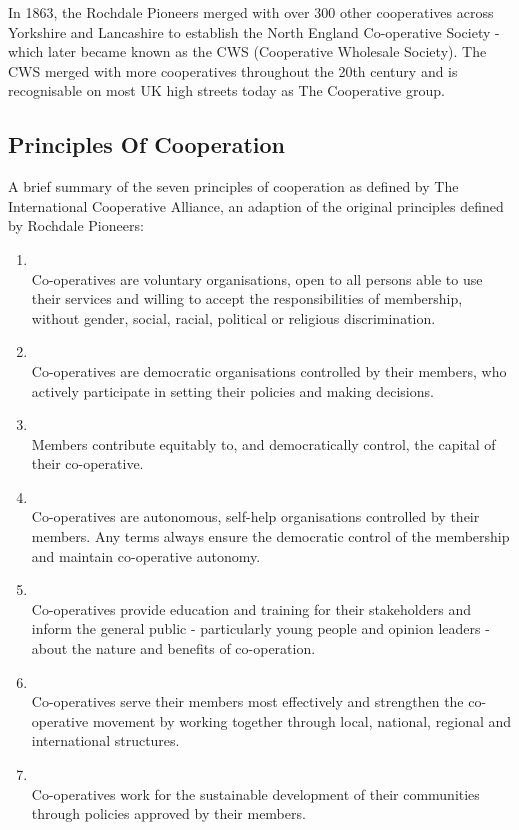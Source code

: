 In 1863, the Rochdale Pioneers merged with over 300 other cooperatives across Yorkshire and Lancashire to establish the North England Co-operative Society - which later became known as the CWS (Cooperative Wholesale Society). The CWS merged with more cooperatives throughout the 20th century and is recognisable on most UK high streets today as The Cooperative group.\\

\subsection{Principles Of Cooperation}
A brief summary of the seven principles of cooperation as defined by The International Cooperative Alliance\cite{ICA}, an adaption of the original principles defined by Rochdale Pioneers:\\

\begin{enumerate}
\item {} \\ Co-operatives are voluntary organisations, open to all persons able to use their services and willing to accept the responsibilities of membership, without gender, social, racial, political or religious discrimination.

\item {} \\ Co-operatives are democratic organisations controlled by their members, who actively participate in setting their policies and making decisions. 

\item {} \\ Members contribute equitably to, and democratically control, the capital of their co-operative.

\item {} \\ Co-operatives are autonomous, self-help organisations controlled by their members. Any terms always ensure the democratic control of the membership and maintain co-operative autonomy.

\item {} \\ Co-operatives provide education and training for their stakeholders and inform the general public - particularly young people and opinion leaders - about the nature and benefits of co-operation.

\item {} \\ Co-operatives serve their members most effectively and strengthen the co-operative movement by working together through local, national, regional and international structures.

\item {} \\ Co-operatives work for the sustainable development of their communities through policies approved by their members.

\end{enumerate}

